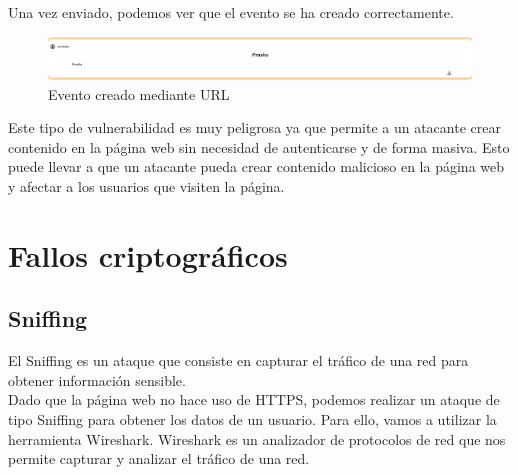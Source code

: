 \documentclass{report}
\begin{document}
                Una vez enviado, podemos ver que el evento se ha creado correctamente.
                \begin{figure}[H]
                    \centering
                    \includegraphics[width=1\textwidth]{./img/vulnerabilidades/2.1/1.1.png}
                    \caption{Evento creado mediante URL}
                \end{figure}

                Este tipo de vulnerabilidad es muy peligrosa ya que permite a un atacante crear contenido en la página web sin necesidad de autenticarse y de forma masiva.
                Esto puede llevar a que un atacante pueda crear contenido malicioso en la página web y afectar a los usuarios que visiten la página.               
            \clearpage
        \section{Fallos criptográficos}
            \subsection{Sniffing}
                El Sniffing es un ataque que consiste en capturar el tráfico de una red para obtener información sensible.\\
                Dado que la página web no hace uso de HTTPS, podemos realizar un ataque de tipo Sniffing para obtener los datos de un usuario.
                Para ello, vamos a utilizar la herramienta Wireshark.
                Wireshark es un analizador de protocolos de red que nos permite capturar y analizar el tráfico de una red.\\
\end{document}
